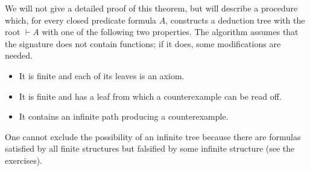

\setcounter{section}{2}
\setcounter{subsection}{3}
\setcounter{dfn}{9}

We will not give a detailed proof of this theorem, but will describe a procedure which, for every closed predicate formula $A$,
constructs a deduction tree with the root $\vdash A$ with one of the following two properties.
The algorithm assumes that the signature does not contain functions; if it does, some modifications are needed.

\begin{itemize}
\item
It is finite and each of its leaves is an axiom.
\item
It is finite and has a leaf from which a counterexample can be read off.
\item
It contains an infinite path producing a counterexample.
\end{itemize}

One cannot exclude the possibility of an infinite tree because there are formulas satisfied by all finite structures
but falsified by some infinite structure (see the exercises).

